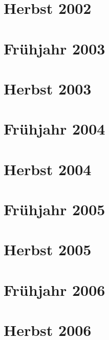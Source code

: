 \documentclass{lehramt-informatik-examen-sammlung}
\begin{document}
\section{Herbst 2002}


\section{Frühjahr 2003}


\section{Herbst 2003}


\section{Frühjahr 2004}


\section{Herbst 2004}


\section{Frühjahr 2005}


\section{Herbst 2005}


\section{Frühjahr 2006}


\section{Herbst 2006}

\end{document}
